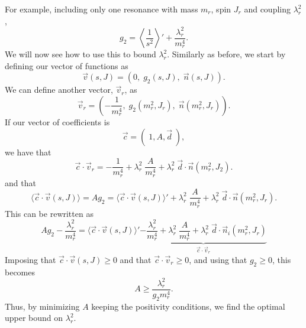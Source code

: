 For example, including only one resonance with mass $m_r$, spin $J_r$ and coupling $\lambda_r^2$,
\begin{equation}
    g_2 = \left\langle \frac{1}{s^2} \right\rangle' + \frac{\lambda_r^2}{m_r^4}.
\end{equation}
We will now see how to use this to bound $\lambda_r^2$. Similarly as before, we start by defining our vector of functions as 
\begin{equation}
    \vec{v}(s,J) = \left(0, \; g_2(s,J), \; \vec{n}(s, J) \right).
\end{equation}
We can define another vector, $\vec{v}_r$, as 
\begin{equation}
    \vec{v}_r  =  \left(-\frac{1}{m_r^4}, \; g_2(m_r^2,J_r),  \; \vec{n}(m_r^2, J_r) \right).
\end{equation}
If our vector of coefficients is 
\begin{equation}
    \vec{c} = (\;1, A, \vec{d}\;),
\end{equation}
we have that 
\begin{equation}
    \vec{c} \cdot \vec{v}_r = - \frac{1}{m_r^4} + \lambda_r^2  \;  \frac{A}{m_r^4} + \lambda_r^2 \; \vec{d} \cdot \vec{n}(m_r^2, J_2).
\end{equation}
and that
\begin{equation}
    \langle \vec{c} \cdot  \vec{v}(s, J) \rangle =  A g_2 =  \langle\vec{c} \cdot \vec{v}(s, J) \rangle'  + \lambda_r^2  \;  \frac{A}{m_r^4} + \lambda_r^2 \; \vec{d} \cdot \vec{n}(m_r^2, J_r).
\end{equation}
This can be rewritten as 
\begin{equation}
    Ag_2 - \frac{\lambda_r^2}{m_r^4} =  \langle\vec{c} \cdot \vec{v}(s, J) \rangle' \underbrace{ - \frac{\lambda_r^2}{m_r^4} + \lambda_r^2  \;  \frac{A}{m_r^4} + \lambda_r^2 \; \vec{d} \cdot \vec{n}_i(m_r^2, J_r)}_{\vec{c}\cdot \vec{v}_r}
\end{equation}
Imposing that $ \vec{c} \cdot \vec{v}(s, J)  \geq 0$ and that $\vec{c}\cdot \vec{v}_r \geq 0$, and using that $g_2 \geq 0$, this becomes 
\begin{equation}
    A \geq \frac{\lambda_r^2}{g_2 m_r^4}. 
    \label{eq:coupling}
\end{equation}
Thus, by minimizing $A$ keeping the positivity conditions, we find the optimal upper bound on $\lambda_r^2$.

